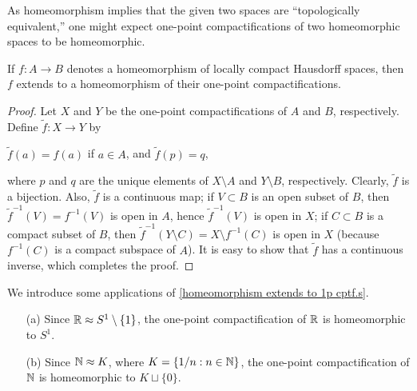 As homeomorphism implies that the given two spaces are ``topologically equivalent,'' one might expect one-point compactifications of two homeomorphic spaces to be homeomorphic.
\begin{thm}\label{homeomorphism extends to 1p cptf.s}
    If $f: A\rightarrow B$ denotes a homeomorphism of locally compact Hausdorff spaces, then $f$ extends to a homeomorphism of their one-point compactifications.
\end{thm}
\begin{proof}
    Let $X$ and $Y$ be the one-point compactifications of $A$ and $B$, respectively.
    Define $\tilde{f}: X\rightarrow Y$ by
    \begin{center}
        $\tilde{f}(a)=f(a)$ if $a\in A$, and $\tilde{f}(p)=q$,
    \end{center}
    where $p$ and $q$ are the unique elements of $X\setminus A$ and $Y\setminus B$, respectively.
    Clearly, $\tilde{f}$ is a bijection.
    Also, $\tilde{f}$ is a continuous map; if $V\subset B$ is an open subset of $B$, then $\tilde{f}^{-1}(V)=f^{-1}(V)$ is open in $A$, hence $\tilde{f}^{-1}(V)$ is open in $X$; if $C\subset B$ is a compact subset of $B$, then $\tilde{f}^{-1}(Y\setminus C)=X\setminus f^{-1}(C)$ is open in $X$ (because $f^{-1}(C)$ is a compact subspace of $A$).
    It is easy to show that $\tilde{f}$ has a continuous inverse, which completes the proof.
\end{proof}
\begin{exmp}
    We introduce some applications of \cref{homeomorphism extends to 1p cptf.s}.
    \begin{enumerate}
        \item[(a)]
        {
            Since ${\mathbb{R}}\approx S^1\setminus\{1\}$, the one-point compactification of ${\mathbb{R}}$ is homeomorphic to $S^1$.
        }
        \item[(b)]
        {
            Since ${\mathbb{N}}\approx K$, where $K=\left\{1/n: n\in{\mathbb{N}}\right\}$, the one-point compactification of ${\mathbb{N}}$ is homeomorphic to $K\sqcup\{0\}$.
        }
    \end{enumerate}
\end{exmp}